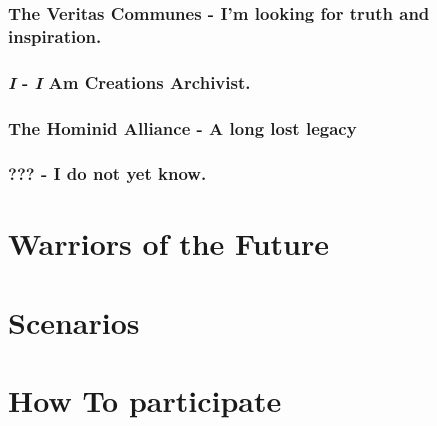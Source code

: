 \documentclass[a4paper,12pt]{report}
\begin{document}
\subsection{The  Veritas Communes - I'm looking for truth and inspiration. }

\subsection{\textit{I} - \textit{I} Am Creations Archivist.}

\subsection{The Hominid Alliance - A long lost legacy}

\subsection{??? - I do not yet know.}

\chapter{Warriors of the Future}

\chapter{Scenarios}

\chapter{How To participate}
\end{document}

